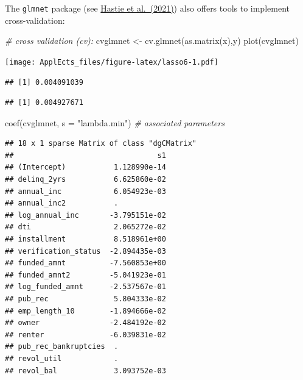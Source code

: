 \documentclass[
  12pt,
]{book}
\newenvironment{Shaded}{\begin{snugshade}}{\end{snugshade}}
\newcommand{\AttributeTok}[1]{\textcolor[rgb]{0.77,0.63,0.00}{#1}}
\newcommand{\CommentTok}[1]{\textcolor[rgb]{0.56,0.35,0.01}{\textit{#1}}}
\newcommand{\FloatTok}[1]{\textcolor[rgb]{0.00,0.00,0.81}{#1}}
\newcommand{\FunctionTok}[1]{\textcolor[rgb]{0.00,0.00,0.00}{#1}}
\newcommand{\NormalTok}[1]{#1}
\newcommand{\OtherTok}[1]{\textcolor[rgb]{0.56,0.35,0.01}{#1}}
\newcommand{\SpecialCharTok}[1]{\textcolor[rgb]{0.00,0.00,0.00}{#1}}
\newcommand{\StringTok}[1]{\textcolor[rgb]{0.31,0.60,0.02}{#1}}
\theoremstyle{definition}
\theoremstyle{definition}
\theoremstyle{definition}
\theoremstyle{definition}
\theoremstyle{remark}
\begin{document}
The \texttt{glmnet} package (see \href{https://glmnet.stanford.edu/articles/glmnet.html}{Hastie et al.~(2021)}) also offers tools to implement cross-validation:

\begin{Shaded}
\begin{Highlighting}[]
\CommentTok{\# cross validation (cv):}
\NormalTok{cvglmnet }\OtherTok{\textless{}{-}} \FunctionTok{cv.glmnet}\NormalTok{(}\FunctionTok{as.matrix}\NormalTok{(x),y)}
\FunctionTok{plot}\NormalTok{(cvglmnet)}
\end{Highlighting}
\end{Shaded}

\texttt{[image: ApplEcts\_files/figure-latex/lasso6-1.pdf]}

\begin{Shaded}
\end{Shaded}

\begin{verbatim}
## [1] 0.004091039
\end{verbatim}

\begin{Shaded}
\end{Shaded}

\begin{verbatim}
## [1] 0.004927671
\end{verbatim}

\begin{Shaded}
\begin{Highlighting}[]
\FunctionTok{coef}\NormalTok{(cvglmnet, }\AttributeTok{s =} \StringTok{"lambda.min"}\NormalTok{) }\CommentTok{\# associated parameters}
\end{Highlighting}
\end{Shaded}

\begin{verbatim}
## 18 x 1 sparse Matrix of class "dgCMatrix"
##                                 s1
## (Intercept)           1.128990e-14
## delinq_2yrs           6.625860e-02
## annual_inc            6.054923e-03
## annual_inc2           .           
## log_annual_inc       -3.795151e-02
## dti                   2.065272e-02
## installment           8.518961e+00
## verification_status  -2.894435e-03
## funded_amnt          -7.560853e+00
## funded_amnt2         -5.041923e-01
## log_funded_amnt      -2.537567e-01
## pub_rec               5.804333e-02
## emp_length_10        -1.894666e-02
## owner                -2.484192e-02
## renter               -6.039831e-02
## pub_rec_bankruptcies  .           
## revol_util            .           
## revol_bal             3.093752e-03
\end{verbatim}
\end{document}
